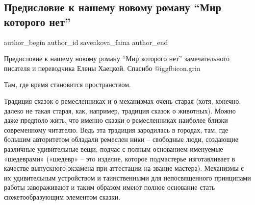  
 
 
 
 
 
\subsection{Предисловие к нашему новому роману \enquote{Мир которого нет}}
\label{sec:23_12_2021.fb.savenkova_faina.1.predislovie_roman_mir_kotorogo_net}
 
\ifcmt
 author_begin
   author_id savenkova_faina
 author_end
\fi

Предисловие к нашему новому роману \enquote{Мир которого нет} замечательного писателя и
переводчика Елены Хаецкой. Спасибо @igg{fbicon.grin} 

Там, где время становится пространством.


Традиция сказок о ремесленниках и о механизмах очень старая (хотя, конечно,
далеко не такая старая, как, например, традиция сказок о животных). Можно даже
предполо жить, что именно сказки о ремесленниках наиболее близки современному
читателю. Ведь эта традиция зародилась в городах, там, где большим авторитетом
обладали ремеслен ники – свободные люди, создающие различные удивительные
вещи, подчас с полным основанием именуемые «шедеврами» («шедевр» – это
изделие, которое подмастерье изготавливает в качестве выпускного экзамена при
аттестации на звание мастера). Механизмы с их удивительным устройством и
таинственными для непосвященного принципами работы завораживают и таким образом
имеют полное основание стать сюжетообразующим элементом сказки.


